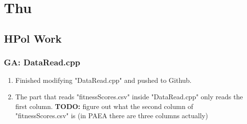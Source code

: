 \documentclass[12pt,letterpaper]{article}
\begin{document}
\newpage
\setcounter{section}{5}

\section{Thu}
\subsection{HPol Work}
\subsubsection{GA: DataRead.cpp}
\begin{enumerate}
  \item Finished modifying "DataRead.cpp" and pushed to Github.
  \item The part that reads "fitnessScores.csv" inside "DataRead.cpp" only reads the 
    first column. \textbf{TODO:} figure out what the second column of "fitnessScores.csv"
    is (in PAEA there are three columns actually)
\end{enumerate}


\end{document}
